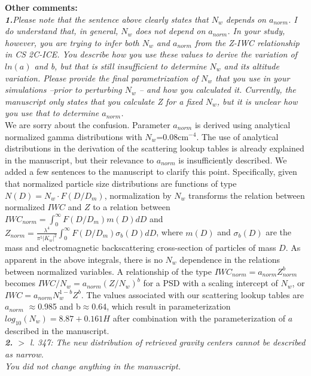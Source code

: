 \documentclass[12pt]{article}
\begin{document}
\noindent \textbf{Other comments:}\\

\noindent\textit{\textbf{1.}Please note that the sentence above clearly states that $N_w$ depends on $a_{norm}$. I do understand that, in general, $N_w$ does not depend on $a_{norm}$. In your study, however, you are trying to infer both $N_w$ and $a_{norm}$ from the Z-IWC relationship in CS 2C-ICE. You describe how you use these values to derive the variation of $ln(a)$ and b, but that is still insufficient to determine $N_w$ and its altitude variation. Please provide the final parametrization of $N_w$ that you use in your simulations --prior to perturbing $N_w$ -- and how you calculated it. Currently, the manuscript only states that you calculate  Z for a fixed $N_w$, but it is unclear how you use that to determine $a_{norm}$.}\\

\noindent We are sorry about the confusion. Parameter $a_{norm}$ is derived using analytical normalized gamma distributions with $N_w$=0.08cm$^{-4}$. The use of analytical distributions in the derivation of the scattering lookup tables is already explained in the manuscript, but their relevance to $a_{norm}$ is insufficiently described. We added a few sentences to the manuscript to clarify this point.  Specifically, given that normalized particle size distributions are functions of type $N(D)=N_w\cdot F(D/D_m)$, normalization by $N_w$ transforms the relation between normalized $IWC$ and $Z$ to a relation between $IWC_{norm}=\int_0^{\infty} F(D/D_m)m(D)dD$ and $Z_{norm}=\frac {\lambda ^4} {\pi ^5 |K_w|^2} \int_0^{\infty} F(D/D_m) \sigma_b(D) dD$, where $m(D)$ and $\sigma_b(D)$ are the mass and electromagnetic backscattering cross-section of particles of mass $D$. As apparent in the above integrals, there is no $N_w$ dependence in the relations between normalized variables. A relationship of the type $IWC_{norm}=a_{norm}Z_{norm}^b$ becomes $IWC/N_w=a_{norm}(Z/N_w)^b$ for a PSD with a scaling intercept of $N_w$, or $IWC=a_{norm}N_w^{1-b}Z^b$. The values associated with our scattering lookup tables are $a_{norm}$ $\approx$0.985 and b$\approx$0.64, which result in parameterization $log_{10}(N_w)=8.87+0.161H$ after combination with the parameterization of $a$ described in the manuscript.\\


\noindent\textit{\textbf{2.}
$>$ l. 347: The new distribution of retrieved gravity centers cannot be described as narrow.\\
You did not change anything in the manuscript.}\\
\end{document}
